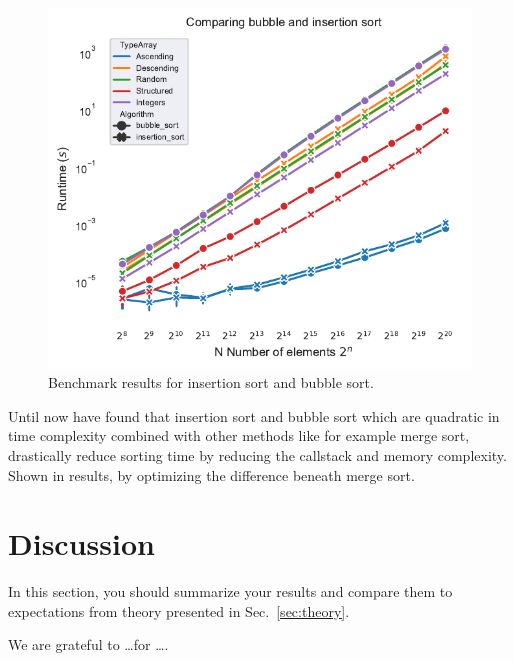 \documentclass[sigconf, nonacm, natbib, screen, balance=False]{acmart}
\begin{document}
\begin{figure}
  \centering
  \includegraphics[scale=0.85]{runtimebubble&insertion.pdf}
  \caption{Benchmark results for insertion sort and bubble sort.}
  \label{fig:bubble_sort}
\end{figure}

Until now have found that insertion sort and bubble sort which are quadratic in time complexity combined with other methods like for example merge sort, drastically reduce sorting time by reducing the callstack and memory complexity. Shown in results, by optimizing the difference beneath merge sort.

\section{Discussion}\label{sec:discussion}

In this section, you should summarize your results and compare them to
expectations from theory presented in Sec.~\ref{sec:theory}.

\begin{acks}
We are grateful to \dots for \dots.
\end{acks}







\end{document}
